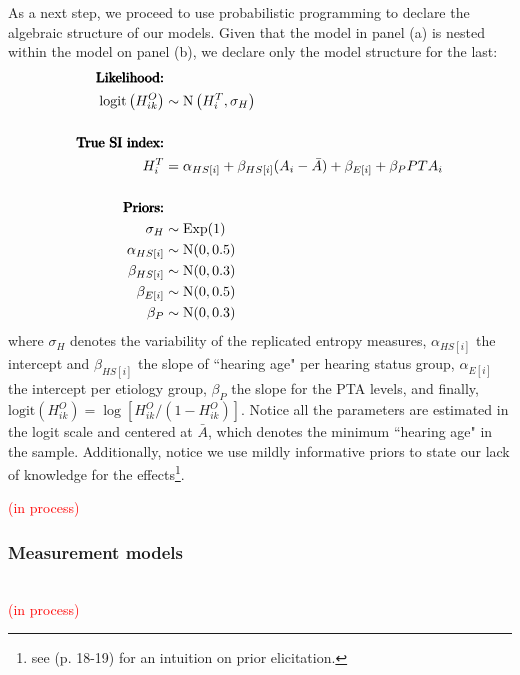 As a next step, we proceed to use probabilistic programming to declare the algebraic structure of our models. Given that the model in panel (a) is nested within the model on panel (b), we declare only the model structure for the last:
%
\begin{align}
	\text{\pmb{Likelihood:}} & \nonumber \\
	\text{logit}\left( H^{O}_{ik} \right) & \sim \text{N} \left( H^{T}_{i}, \sigma_{H} \right) \\ \nonumber \\
	\text{\pmb{True SI index:}} & \nonumber \\
	H^{T}_{i} & = \alpha_{HS[i]} + \beta_{HS[i]} (A_{i} - \bar{A}) + \beta_{E[i]} + \beta_{P} PTA_{i} \\ \nonumber \\
	\text{\pmb{Priors:}} & \nonumber \\
	\sigma_{H} & \sim \text{Exp}(1) \\
	\alpha_{HS[i]} & \sim \text{N}(0, 0.5) \\
	\beta_{HS[i]} & \sim \text{N}(0 , 0.3) \\
	\beta_{E[i]} & \sim \text{N}(0, 0.5) \\
	\beta_{P} & \sim \text{N}(0, 0.3)
\end{align}
%
where $\sigma_{H}$ denotes the variability of the replicated entropy measures, $\alpha_{HS[i]}$ the intercept and $\beta_{HS[i]}$ the slope of ``hearing age" per hearing status group, $\alpha_{E[i]}$ the intercept per etiology group, $\beta_{P}$ the slope for the PTA levels, and finally, $\text{logit}\left( H^{O}_{ik} \right) = \log \left[ H^{O}_{ik} / ( 1 - H^{O}_{ik} ) \right]$. Notice all the parameters are estimated in the logit scale and centered at $\bar{A}$, which denotes the minimum ``hearing age" in the sample. Additionally, notice we use mildly informative priors to state our lack of knowledge for the effects\footnote{see \citet{Rivera_2021} (p. 18-19) for an intuition on prior elicitation.}.

\textcolor{red}{(in process)}
%
%
\subsubsection{Measurement models} \\
%
\textcolor{red}{(in process)}

